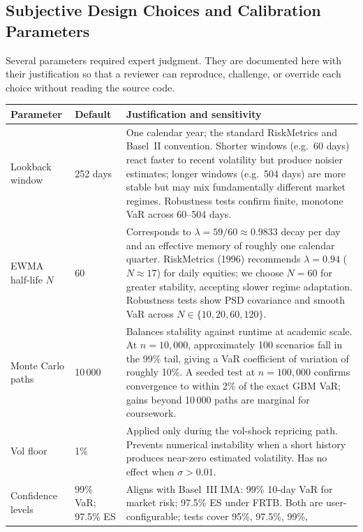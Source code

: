 \documentclass[11pt]{article}
\begin{document}
\subsection{Subjective Design Choices and Calibration Parameters}
\label{sec:subjective}

Several parameters required expert judgment.  They are documented here
with their justification so that a reviewer can reproduce, challenge, or
override each choice without reading the source code.

\begin{center}
\begin{tabular}{L{3.0cm}L{1.8cm}L{8.0cm}}
\toprule
\textbf{Parameter} & \textbf{Default} & \textbf{Justification and sensitivity} \\
\midrule
Lookback window
  & 252 days
  & One calendar year; the standard RiskMetrics and Basel~II convention.
    Shorter windows (e.g.\ 60 days) react faster to recent volatility but
    produce noisier estimates; longer windows (e.g.\ 504 days) are more
    stable but may mix fundamentally different market regimes.
    Robustness tests confirm finite, monotone VaR across 60--504 days. \\[4pt]
EWMA half-life $N$
  & 60
  & Corresponds to $\lambda = 59/60 \approx 0.9833$ decay per day and an
    effective memory of roughly one calendar quarter.  RiskMetrics (1996)
    recommends $\lambda=0.94$ ($N\approx17$) for daily equities; we choose
    $N=60$ for greater stability, accepting slower regime adaptation.
    Robustness tests show PSD covariance and smooth VaR across $N \in
    \{10, 20, 60, 120\}$. \\[4pt]
Monte Carlo paths
  & 10\,000
  & Balances stability against runtime at academic scale.  At
    $n=10{,}000$, approximately 100 scenarios fall in the 99\% tail,
    giving a VaR coefficient of variation of roughly 10\%.  A seeded test
    at $n=100{,}000$ confirms convergence to within 2\% of the exact
    GBM VaR; gains beyond 10\,000 paths are marginal for coursework. \\[4pt]
Vol floor
  & 1\%
  & Applied only during the vol-shock repricing path.  Prevents numerical
    instability when a short history produces near-zero estimated
    volatility.  Has no effect when $\sigma > 0.01$. \\[4pt]
Confidence levels
  & 99\% VaR; 97.5\% ES
  & Aligns with Basel~III IMA: 99\% 10-day VaR for market risk; 97.5\% ES
    under FRTB.  Both are user-configurable; tests cover 95\%, 97.5\%, 99\%,

\end{tabular}
\end{center}
\end{document}
